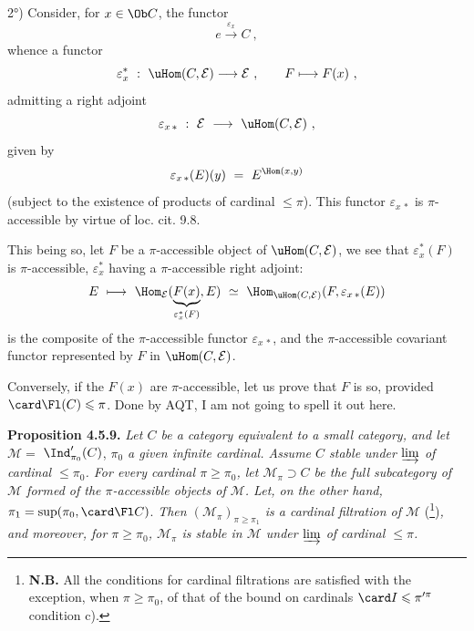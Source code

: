 
2°) Consider, for $x \in \Ob C$, the functor
\[
e \xrightarrow{\ \varepsilon_x\ } C \ ,
\]
whence a functor
\[
\varepsilon_x^* \ : \ \uHom(C,\mathcal{E}) \longrightarrow \mathcal{E} \ , \qquad F \longmapsto F(x) \ ,
\]
admitting a right adjoint
\[
\varepsilon_{x\,*} \ : \ \mathcal{E} \ \longrightarrow \ \uHom(C,\mathcal{E}) \ ,
\]
given by
\[
\varepsilon_{x\,*}(E)(y) \ = \ E^{\Hom(x,y)}
\]
(subject to the existence of products of cardinal $\leqslant \pi$). This functor $\varepsilon_{x\,*}$ is $\pi$-accessible by virtue of loc. cit. 9.8.

This being so, let $F$ be a $\pi$-accessible object of $\uHom(C,\mathcal{E})$, we see that $\varepsilon_x^*(F)$ is $\pi$-accessible, $\varepsilon_x^*$ having a $\pi$-accessible right adjoint:
\[
E \ \longmapsto \ \Hom_{\mathcal{E}}(\underbrace{F(x)}_{\varepsilon_x^*(F)}, E) \ \simeq \ \Hom_{\uHom(C,\mathcal{E})}(F, \varepsilon_{x\,*}(E))
\]
is the composite of the $\pi$-accessible functor $\varepsilon_{x\,*}$, and the $\pi$-accessible covariant functor represented by $F$ in $\uHom(C,\mathcal{E})$.

Conversely, if the $F(x)$ are $\pi$-accessible, let us prove that $F$ is so, provided $\card \Fl(C) \leqslant \pi$. Done by AQT, I am not going to spell it out here.


\textbf{Proposition 4.5.9.} \textit{Let $C$ be a category equivalent to a small category, and let $\mathcal{M} = $} $\Ind'_{\pi_0}(C)$, \textit{$\pi_0$ a given infinite cardinal. Assume $C$ stable under $\varinjlim$ of cardinal $\leqslant \pi_0$. For every cardinal $\pi \geqslant \pi_0$, let $\mathcal{M}_\pi \supset C$ be the full subcategory of $\mathcal{M}$ formed of the $\pi$-accessible objects of $\mathcal{M}$. Let, on the other hand,} $\pi_1 = \sup(\pi_0, \card \Fl C)$. \textit{Then $(\mathcal{M}_\pi)_{\pi \geqslant \pi_1}$ is a cardinal filtration of $\mathcal{M}$} (\footnote{\textbf{N.B.} All the conditions for cardinal filtrations are satisfied with the exception, when $\pi \geqslant \pi_0$, of that of the bound on cardinals $\card I \leqslant \pi'^{\pi}$ condition c).})\textit{, and moreover, for $\pi \geqslant \pi_0$, $\mathcal{M}_\pi$ is stable in $\mathcal{M}$ under $\varinjlim$ of cardinal $\leqslant \pi$.}

